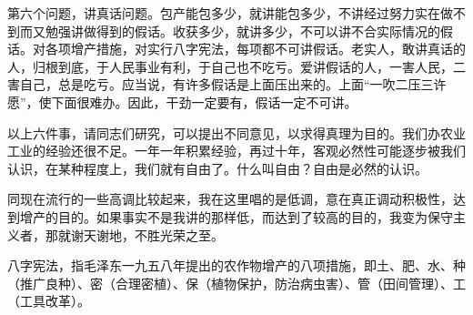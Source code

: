 第六个问题，讲真话问题。包产能包多少，就讲能包多少，不讲经过努力实在做不到而又勉强讲做得到的假话。收获多少，就讲多少，不可以讲不合实际情况的假话。对各项增产措施，对实行八字宪法，每项都不可讲假话。老实人，敢讲真话的人，归根到底，于人民事业有利，于自己也不吃亏。爱讲假话的人，一害人民，二害自己，总是吃亏。应当说，有许多假话是上面压出来的。上面“一吹二压三许愿”，使下面很难办。因此，干劲一定要有，假话一定不可讲。

以上六件事，请同志们研究，可以提出不同意见，以求得真理为目的。我们办农业工业的经验还很不足。一年一年积累经验，再过十年，客观必然性可能逐步被我们认识，在某种程度上，我们就有自由了。什么叫自由？自由是必然的认识。

同现在流行的一些高调比较起来，我在这里唱的是低调，意在真正调动积极性，达到增产的目的。如果事实不是我讲的那样低，而达到了较高的目的，我变为保守主义者，那就谢天谢地，不胜光荣之至。

\begin{maonote}
八字宪法，指毛泽东一九五八年提出的农作物增产的八项措施，即土、肥、水、种（推广良种）、密（合理密植）、保（植物保护，防治病虫害）、管（田间管理）、工（工具改革）。
\end{maonote}
